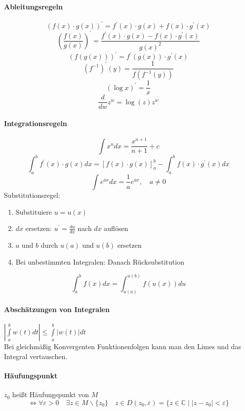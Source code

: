 \documentclass[a4paper, 10pt, DIV20, headings=small]{scrartcl}
\theoremstyle{definition}
\theoremstyle{plain}
\begin{document}
\begin{minipage}{0.5\textwidth}
\paragraph{Ableitungsregeln}
$$\left(f(x) \cdot g(x)\right)^\prime = f^\prime(x) \cdot g(x) + f(x) \cdot g^\prime(x)$$
$$\left(\frac{f(x)}{g(x)}\right)^\prime = \frac{f^\prime(x) \cdot g(x) - f(x) \cdot g^\prime(x)}{g(x)^2}$$
$$\left(f(g(x))\right)^\prime = f^\prime(g(x)) \cdot g^\prime(x)$$
$$(f^{-1})^\prime(y) = \frac{1}{f(f^{-1}(y))}$$
$$(\log x)^\prime = \frac{1}{x}$$
$$\frac{d}{dw} z^w = \log(z) z^w$$
\end{minipage}
\begin{minipage}{0.5\textwidth}
\paragraph{Integrationsregeln}
$$\int x^n dx = \frac{x^{n+1}}{n+1}+c$$
$$\int_a^b f^\prime(x) \cdot g(x) dx = [f(x) \cdot g(x)]_a^b - \int_a^b f(x) \cdot g^\prime(x) dx$$
$$\int e^{ax}dx = \frac{1}{a} e^{ax}, \quad a \neq 0$$
Substitutionsregel:
\begin{enumerate}
\item Substituiere $u = u(x)$
\item $dx$ ersetzen: $u^\prime = \frac{du}{dx}$ nach $dx$ auflösen
\item $a$ und $b$ durch $u(a)$ und $u(b)$ ersetzen
\item Bei unbestimmten Integralen: Danach Rücksubstitution
\end{enumerate}
$$\int_a^b f(x) dx = \int_{u(a)}^{u(b)} f(u(x)) du$$
\end{minipage}

\paragraph{Abschätzungen von Integralen}
$|\int\limits_{a}^b{w(t)dt}| \leq \int\limits_a^b{|w(t)|dt}$
\\
Bei gleichmäßig Konvergenten Funktionenfolgen kann man den Limes und das Integral vertauschen.

\paragraph{Häufungspunkt}
$z_0$ heißt Häufungspunkt von $M$
$$\Leftrightarrow \forall \varepsilon > 0 \quad \exists z \in M \backslash \{z_0\} \quad z \in D(z_0, \varepsilon) = \{z \in \mathbb{C} \mid |z-z_0| < \varepsilon\}$$
\end{document}
